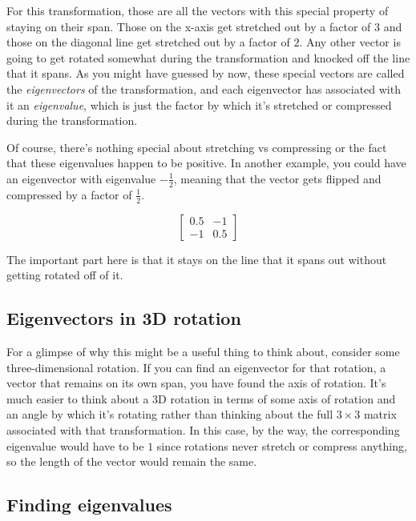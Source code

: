 For this transformation, those are all the vectors with this special property of
staying on their span. Those on the x-axis get stretched out by a factor of $3$
and those on the diagonal line get stretched out by a factor of $2$. Any other
vector is going to get rotated somewhat during the transformation and knocked
off the line that it spans. As you might have guessed by now, these special
vectors are called the \textit{eigenvectors} of the transformation, and each
eigenvector has associated with it an \textit{eigenvalue}, which is just the
factor by which it's stretched or compressed during the transformation.

Of course, there's nothing special about stretching vs compressing or the fact
that these eigenvalues happen to be positive. In another example, you could have
an eigenvector with eigenvalue $-\frac{1}{2}$, meaning that the vector gets
flipped and compressed by a factor of $\frac{1}{2}$.

\begin{equation*}
  \begin{bmatrix}
    0.5 & -1 \\
    -1 & 0.5
  \end{bmatrix}
\end{equation*}

The important part here is that it stays on the line that it spans out without
getting rotated off of it.

\subsection{Eigenvectors in 3D rotation}

For a glimpse of why this might be a useful thing to think about, consider some
three-dimensional rotation. If you can find an eigenvector for that rotation, a
vector that remains on its own span, you have found the axis of rotation. It's
much easier to think about a 3D rotation in terms of some axis of rotation and
an angle by which it's rotating rather than thinking about the full $3 \times 3$
matrix associated with that transformation. In this case, by the way, the
corresponding eigenvalue would have to be $1$ since rotations never stretch or
compress anything, so the length of the vector would remain the same.

\subsection{Finding eigenvalues}

